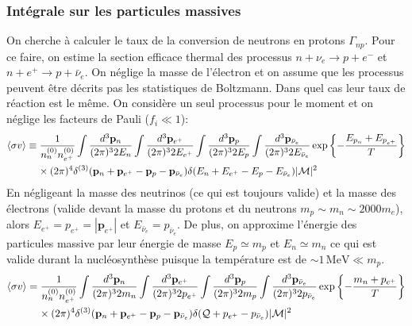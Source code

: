\documentclass{article}
\numberwithin{equation}{section}
\newcommand{\s}{\hspace{0.1cm}}
\begin{document}
\subsubsection{Intégrale sur les particules massives}
On cherche à calculer le taux de la conversion de neutrons en protons $\Gamma_{np}$.
Pour ce faire, on estime la section efficace thermal des processus 
$n + \nu_e \longrightarrow p + e^{-}$ et $n + e^{+} \longrightarrow p + \bar{\nu}_e$. 
On néglige la masse de l'électron et on assume que les processus peuvent être 
décrits pas les statistiques de Boltzmann. Dans quel cas leur taux de réaction 
est le même. On considère un seul processus pour le moment et on néglige les 
facteurs de Pauli ($f_i \ll 1$):
\begin{align*}
        \expval{\sigma v} &\equiv \frac{1}{n_n^{(0)} n_{e^{+}}^{(0)}}
        \int \frac{d^{3}\mathbf{p}_n}{(2\pi)^{3}2E_{n}}
        \int \frac{d^{3}\mathbf{p}_{e^{+}}}{(2\pi)^{3}2E_{e^{+}}}
        \int \frac{d^{3}\mathbf{p}_{p}}{(2\pi)^{3}2E_p}
        \int \frac{d^{3}\mathbf{p}_{\bar{\nu}_e}}{(2\pi)^{3}2E_{\bar{\nu}_e}}
        \exp \left\{ - \frac{E_{p_n} + E_{p_{e^{+}}}}{T} \right\}\\
                          &\s\s\s\s\times 
        (2 \pi)^{4} \delta^{(3)}(\mathbf{p}_n + 
        \mathbf{p}_{e^{+}} - \mathbf{p}_p - \mathbf{p}_{\bar{\nu}_e}) 
        \delta(E_{n} + E_{e^{+}} - E_p - E_{\bar{\nu}_e})
        |\mathcal{M}|^{2}
\end{align*}
En négligeant la masse des neutrinos (ce qui est toujours valide) et la masse des 
électrons (valide devant la masse du protons et du neutrons $m_p \sim m_n \sim 2000m_e$), 
alors $E_{e^{+}} = p_{e^{+}} = |\mathbf{p}_{e^{+}}|$ et 
$E_{\bar{\nu}_e} = p_{\bar{\nu}_e}$. De plus,
on approxime l'énergie des particules massive par leur énergie de masse 
$E_p \simeq m_p$ et $E_n \simeq m_n$ ce qui est valide durant la 
nucléosynthèse puisque la température est de $\sim1\, \text{MeV} \ll m_p$.
\begin{align*}
        \expval{\sigma v} &= \frac{1}{n_n^{(0)} n_{e^{+}}^{(0)}}
        \int \frac{d^{3}\mathbf{p}_n}{(2\pi)^{3}2m_n}
        \int \frac{d^{3}\mathbf{p}_{e^{+}}}{(2\pi)^{3}2p_{e^{+}}}
        \int \frac{d^{3}\mathbf{p}_{p}}{(2\pi)^{3}2m_p}
        \int \frac{d^{3}\mathbf{p}_{\bar{\nu}_e}}{(2\pi)^{3}2p_{\bar{\nu}_e}}
        \exp \left\{ - \frac{m_n + p_{e^{+}}}{T} \right\}\\
                          &\s\s\s\s\times 
        (2 \pi)^{4 } \delta^{(3)}(\mathbf{p}_n + 
        \mathbf{p}_{e^{+}} - \mathbf{p}_p - \mathbf{p}_{\bar{\nu}_e}) 
        \delta(\mathcal{Q} + p_{e^{+}} - p_{\bar{\nu}_e})
        |\mathcal{M}|^{2}
\end{align*}
\end{document}

